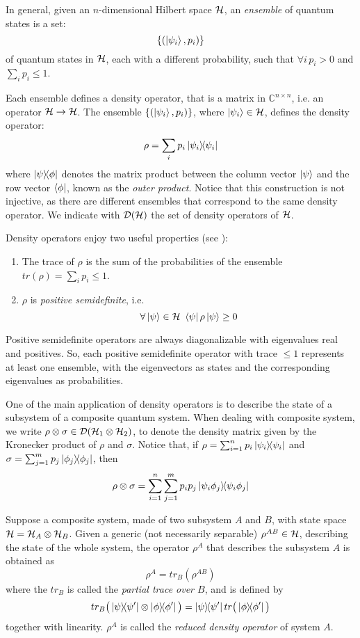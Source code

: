 In general, given an $n$-dimensional Hilbert space $\mathcal{H}$, an \textit{ensemble} of quantum states is a set:
\[\{(\ket{\psi_i}, p_i)\} \]
of quantum states in $\mathcal{H}$, each with a different probability, such that $\forall i \, p_i > 0$ and $\sum_i p_i \leq 1$.

Each ensemble defines a density operator, that is a matrix in $\mathbb{C}^{n \times n}$, i.e. an operator $\mathcal{H} \rightarrow \mathcal{H}$. The ensemble $\{(\ket{\psi_i}, p_i)\}$, where $\ket{\psi_i} \in \mathcal{H}$, defines the density operator: 
\[
	\rho = \sum_i p_i \ket{\psi_i}\!\!\bra{\psi_i}
\]
where $\ket{\psi}\!\!\bra{\phi}$ denotes the matrix product between the column vector $\ket{\psi}$ and the row vector $\bra{\phi}$, known as the \textit{outer product}. Notice that this construction is not injective, as there are different ensembles that correspond to the same density operator. We indicate with $\mathcal{D}(\mathcal{H})$ the set of density operators of $\mathcal{H}$.

Density operators enjoy two useful properties (see \cite{nielsenQuantumComputationQuantum2001}): \begin{enumerate}
\item The trace of $\rho$ is the sum of the probabilities of the ensemble $tr(\rho) = \sum_i p_i \leq 1$.
\item $\rho$ is \textit{positive semidefinite}, i.e. 
\[\forall \ket{\psi} \in \mathcal{H} \ \bra{\psi}\rho\ket{\psi} \geq 0\]
\end{enumerate}

Positive semidefinite operators are always diagonalizable with eigenvalues real and positives. So, each positive semidefinite operator with trace $\leq 1$ represents at least one ensemble, with the eigenvectors as states and the corresponding eigenvalues as probabilities.

One of the main application of density operators is to describe the state of a subsystem of a composite quantum system. When dealing with composite system, we write $\rho \otimes \sigma \in \mathcal{D}(\mathcal{H}_1 \otimes \mathcal{H}_2)$, to denote the density matrix given by the Kronecker product of $\rho$ and $\sigma$. Notice that, if $\rho = \sum_{i=1}^n p_i\ket{\psi_i}\!\!\bra{\psi_i}$ and $\sigma = \sum_{j=1}^m p_j\ket{\phi_j}\!\!\bra{\phi_j}$, then 
\[\rho \otimes \sigma = \sum_{i=1}^n\sum_{j=1}^m p_ip_j \ket{\psi_i\phi_j}\!\!\bra{\psi_i\phi_j}\]

Suppose a composite system, made of two subsystem $A$ and $B$, with state space  $\mathcal{H} = \mathcal{H}_A \otimes \mathcal{H}_B$. Given a generic (not necessarily separable) $\rho^{AB} \in \mathcal{H}$, describing the state of the whole system, the operator $\rho^A$ that describes the subsystem $A$ is obtained as 
\[
	\rho^A = tr_B(\rho^{AB})
\]
where the $tr_B$ is called the \textit{partial trace over $B$}, and is defined by 
\[
 tr_B\big(\ketbra{\psi}{\psi'} \otimes \ketbra{\phi}{\phi'}\big) = \ketbra{\psi}{\psi'}tr\big(\ketbra{\phi}{\phi'}\big)
\]
together with linearity. $\rho^A$ is called the \textit{reduced density operator} of system $A$.

